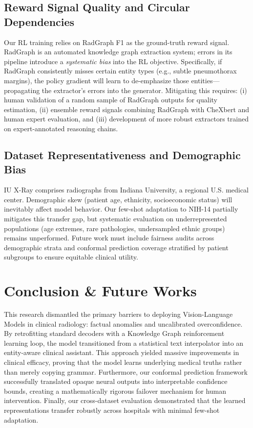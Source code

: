 \documentclass[10pt,a4paper,twocolumn]{article}
\begin{document}
\subsection{Reward Signal Quality and Circular Dependencies}
Our RL training relies on RadGraph F1 as the ground-truth reward signal. RadGraph is an automated knowledge graph extraction system; errors in its pipeline introduce a \emph{systematic bias} into the RL objective. Specifically, if RadGraph consistently misses certain entity types (e.g., subtle pneumothorax margins), the policy gradient will learn to de-emphasize those entities—propagating the extractor's errors into the generator. Mitigating this requires: (i) human validation of a random sample of RadGraph outputs for quality estimation, (ii) ensemble reward signals combining RadGraph with CheXbert and human expert evaluation, and (iii) development of more robust extractors trained on expert-annotated reasoning chains.

\subsection{Dataset Representativeness and Demographic Bias}
IU X-Ray comprises radiographs from Indiana University, a regional U.S. medical center. Demographic skew (patient age, ethnicity, socioeconomic status) will inevitably affect model behavior. Our few-shot adaptation to NIH-14 partially mitigates this transfer gap, but systematic evaluation on underrepresented populations (age extremes, rare pathologies, undersampled ethnic groups) remains unperformed. Future work must include fairness audits across demographic strata and conformal prediction coverage stratified by patient subgroups to ensure equitable clinical utility. 

\section{Conclusion \& Future Works}
\label{sec:conclusion}

This research dismantled the primary barriers to deploying Vision-Language Models in clinical radiology: factual anomalies and uncalibrated overconfidence. By retrofitting standard decoders with a Knowledge Graph reinforcement learning loop, the model transitioned from a statistical text interpolator into an entity-aware clinical assistant. This approach yielded massive improvements in clinical efficacy, proving that the model learns underlying medical truths rather than merely copying grammar. Furthermore, our conformal prediction framework successfully translated opaque neural outputs into interpretable confidence bounds, creating a mathematically rigorous failover mechanism for human intervention. Finally, our cross-dataset evaluation demonstrated that the learned representations transfer robustly across hospitals with minimal few-shot adaptation.
\end{document}
